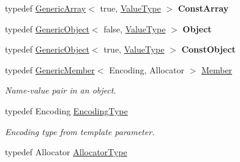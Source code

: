 \begin{DoxyCompactItemize}
\item 
typedef \hyperlink{class_generic_array}{Generic\+Array}$<$ true, \hyperlink{class_generic_value_a43a39bb4fca9b9d3de3da6ac353d25ce}{Value\+Type} $>$ {\bfseries Const\+Array}\hypertarget{class_generic_value_a8f1d2728de56600b5f3df596e2a8a181}{}\label{class_generic_value_a8f1d2728de56600b5f3df596e2a8a181}

\item 
typedef \hyperlink{class_generic_object}{Generic\+Object}$<$ false, \hyperlink{class_generic_value_a43a39bb4fca9b9d3de3da6ac353d25ce}{Value\+Type} $>$ {\bfseries Object}\hypertarget{class_generic_value_aee3606d69d411ce0d98f29639585989b}{}\label{class_generic_value_aee3606d69d411ce0d98f29639585989b}

\item 
typedef \hyperlink{class_generic_object}{Generic\+Object}$<$ true, \hyperlink{class_generic_value_a43a39bb4fca9b9d3de3da6ac353d25ce}{Value\+Type} $>$ {\bfseries Const\+Object}\hypertarget{class_generic_value_a55ad310f5434e0e4a93df616b326ba7e}{}\label{class_generic_value_a55ad310f5434e0e4a93df616b326ba7e}

\item 
typedef \hyperlink{struct_generic_member}{Generic\+Member}$<$ Encoding, Allocator $>$ \hyperlink{class_generic_value_a7ccf27c44058b4c11c3efc6473afb886}{Member}\hypertarget{class_generic_value_a7ccf27c44058b4c11c3efc6473afb886}{}\label{class_generic_value_a7ccf27c44058b4c11c3efc6473afb886}

\begin{DoxyCompactList}\small\item\em Name-\/value pair in an object. \end{DoxyCompactList}\item 
typedef Encoding \hyperlink{class_generic_value_a28c2cb8d04d12566c1af37597a46d209}{Encoding\+Type}\hypertarget{class_generic_value_a28c2cb8d04d12566c1af37597a46d209}{}\label{class_generic_value_a28c2cb8d04d12566c1af37597a46d209}

\begin{DoxyCompactList}\small\item\em Encoding type from template parameter. \end{DoxyCompactList}\item 
typedef Allocator \hyperlink{class_generic_value_a7beb83860c1b8d2a0e2a7da9796b2fa1}{Allocator\+Type}\hypertarget{class_generic_value_a7beb83860c1b8d2a0e2a7da9796b2fa1}{}\label{class_generic_value_a7beb83860c1b8d2a0e2a7da9796b2fa1}


\end{DoxyCompactItemize}
